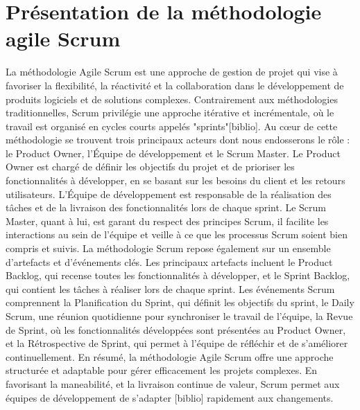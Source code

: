 \section{Présentation de la méthodologie agile Scrum}
La méthodologie Agile Scrum est une approche de gestion de projet qui vise à favoriser la flexibilité, la réactivité et la collaboration dans le développement de produits logiciels et de solutions complexes. Contrairement aux méthodologies traditionnelles, Scrum privilégie une approche itérative et incrémentale, où le travail est organisé en cycles courts appelés "sprints"[biblio].
	Au cœur de cette méthodologie se trouvent trois principaux acteurs dont nous endosserons le rôle : le Product Owner, l'Équipe de développement et le Scrum Master. Le Product Owner est chargé de définir les objectifs du projet et de prioriser les fonctionnalités à développer, en se basant sur les besoins du client et les retours utilisateurs. L'Équipe de développement est responsable de la réalisation des tâches et de la livraison des fonctionnalités lors de chaque sprint. Le Scrum Master, quant à lui, est garant du respect des principes Scrum, il facilite les interactions au sein de l'équipe et veille à ce que les processus Scrum soient bien compris et suivis.
La méthodologie Scrum repose également sur un ensemble d'artefacts et d'événements clés. Les principaux artefacts incluent le Product Backlog, qui recense toutes les fonctionnalités à développer, et le Sprint Backlog, qui contient les tâches à réaliser lors de chaque sprint. Les événements Scrum comprennent la Planification du Sprint, qui définit les objectifs du sprint, le Daily Scrum, une réunion quotidienne pour synchroniser le travail de l'équipe, la Revue de Sprint, où les fonctionnalités développées sont présentées au Product Owner, et la Rétrospective de Sprint, qui permet à l'équipe de réfléchir et de s'améliorer continuellement.
	En résumé, la méthodologie Agile Scrum offre une approche structurée et adaptable pour gérer efficacement les projets complexes. En favorisant la maneabilité, et la livraison continue de valeur, Scrum permet aux équipes de développement de s'adapter [biblio] rapidement aux changements.
	

